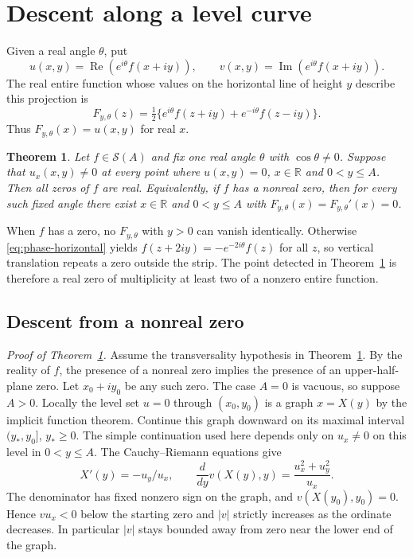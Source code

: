 \documentclass[11pt,a4paper]{article}
\newtheorem{theorem}{Theorem}[section]
\numberwithin{equation}{section}
\renewcommand{\Re}{\operatorname{Re}}\renewcommand{\Im}{\operatorname{Im}}
\begin{document}
\section{Descent along a level curve}\label{sec:fixedprojection}
Given a real angle $\theta$, put
\[
 u(x,y)=\Re(e^{i\theta}f(x+iy)),\qquad
 v(x,y)=\Im(e^{i\theta}f(x+iy)).
\]
The real entire function whose values on the horizontal line of
height $y$ describe this projection is
\begin{equation}\label{eq:phase-horizontal}
 F_{y,\theta}(z)
 =\tfrac12\{e^{i\theta}f(z+iy)+e^{-i\theta}f(z-iy)\}.
\end{equation}
Thus $F_{y,\theta}(x)=u(x,y)$ for real $x$.

\begin{theorem}\label{thm:phase-main}
Let $f\in\mathcal S(A)$ and fix one real angle $\theta$ with
$\cos\theta\ne0$. Suppose that $u_x(x,y)\ne0$ at every point
where $u(x,y)=0$, $x\in\mathbb R$ and $0<y\le A$. Then all zeros
of $f$ are real. Equivalently, if $f$ has a nonreal zero, then for
every such fixed angle there exist $x\in\mathbb R$ and $0<y\le A$
with $F_{y,\theta}(x)=F_{y,\theta}'(x)=0$.
\end{theorem}

When $f$ has a zero, no $F_{y,\theta}$ with $y>0$ can vanish
identically. Otherwise \eqref{eq:phase-horizontal} yields
$f(z+2iy)=-e^{-2i\theta}f(z)$ for all $z$, so vertical translation
repeats a zero outside the strip. The point detected in
Theorem~\ref{thm:phase-main} is therefore a real zero of multiplicity
at least two of a nonzero entire function.

\subsection{Descent from a nonreal zero}
\noindent\textit{Proof of Theorem~\ref{thm:phase-main}.} Assume the transversality hypothesis in Theorem~\ref{thm:phase-main}.
By the reality of $f$, the presence of a nonreal zero implies the
presence of an upper-half-plane zero. Let $x_0+iy_0$ be any such zero.
The case $A=0$ is vacuous, so suppose $A>0$. Locally the level set
$u=0$ through $(x_0,y_0)$ is a graph $x=X(y)$ by the implicit
function theorem. Continue this graph downward on its maximal interval
$(y_*,y_0]$, $y_*\ge0$. The simple continuation used here depends
only on $u_x\ne0$ on this level in $0<y\le A$. The
Cauchy--Riemann equations give
\begin{equation}\label{eq:phase-descent}
 X'(y)=-u_y/u_x,\qquad
 \frac{d}{dy}v(X(y),y)=\frac{u_x^2+u_y^2}{u_x}.
\end{equation}
The denominator has fixed nonzero sign on the graph, and $v(X(y_0),y_0)=0$.
Hence $v u_x<0$ below the starting zero and $|v|$ strictly increases
as the ordinate decreases. In particular $|v|$ stays bounded away
from zero near the lower end of the graph.
\end{document}
